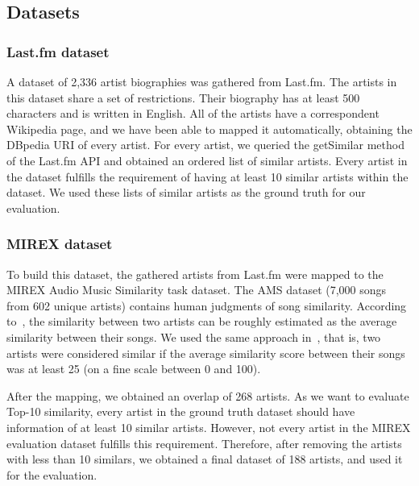 \subsection{Datasets}

\subsubsection{Last.fm dataset}\label{sec:similarity:lastfm_dataset}

A dataset of 2,336 artist biographies was gathered from Last.fm. The artists in this dataset share a set of restrictions.
Their biography has at least 500 characters and is written in English.
All of the artists have a correspondent Wikipedia page, and we have been able to mapped it automatically, obtaining the DBpedia URI of every artist.
For every artist, we queried the getSimilar method of the Last.fm API and obtained an ordered list of similar artists. Every artist in the dataset fulfills the requirement of having at least 10 similar artists within the dataset.
We used these lists of similar artists as the ground truth for our evaluation.

\subsubsection{MIREX dataset} %

To build this dataset, the gathered artists from Last.fm
were mapped to the MIREX Audio Music Similarity task dataset. The AMS dataset (7,000 songs from 602 unique artists) contains human judgments of song similarity. According to~\cite{Schedl2013}, the similarity between two artists can be roughly estimated as the average similarity between their songs. We used the same approach in~\cite{Schedl2013}, that is, two artists were considered similar if the average similarity score between their songs was at least 25 (on a fine scale between 0 and 100).

After the mapping, we obtained an overlap of 268 artists.
As we want to evaluate Top-10 similarity, every artist in the ground truth dataset should have information of at least 10 similar artists. However, not every artist in the MIREX evaluation dataset fulfills this requirement. Therefore, after removing the artists with less than 10 similars, we obtained a final dataset of 188 artists, and used it for the evaluation.

